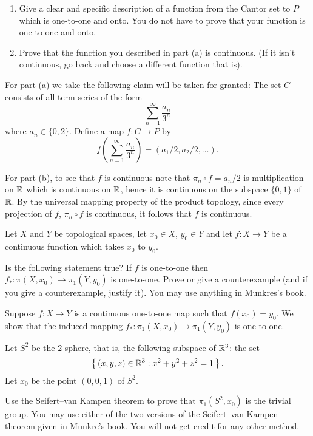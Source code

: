 \begin{problem}
  \hfill
  \begin{enumerate}[label=(\alph*),noitemsep]
  \item Give a clear and specific description of a function from the Cantor
    set to $P$ which is one-to-one and onto. You do not have to prove that
    your function is one-to-one and onto.
  \item Prove that the function you described in part (a) is
    continuous. (If it isn't continuous, go back and choose a different
    function that is).
  \end{enumerate}
\end{problem}
\begin{solution}
  For part (a) we take the following claim will be taken for granted: The
  set $C$ consists of all term series of the form
  \[
    \sum_{n=1}^\infty\frac{a_n}{3^n}
  \]
  where $a_n\in\{0,2\}$. Define a map $f\colon C\to P$ by
  \[
    f\left(\sum_{n=1}^\infty\frac{a_n}{3^n}\right)=(a_1/2,a_2/2,\ldots).
  \]

  For part (b), to see that $f$ is continuous note that
  $\pi_n\circ f=a_n/2$ is multiplication on $\mathbb{R}$ which is continuous on
  $\mathbb{R}$, hence it is continuous on the subspace $\{0,1\}$ of $\mathbb{R}$. By
  the universal mapping property of the product topology, since every
  projection of $f$, $\pi_n\circ f$ is continuous, it follows that $f$ is
  continuous.
\end{solution}

\begin{problem}
  Let $X$ and $Y$ be topological spaces, let $x_0\in X$, $y_0\in Y$ and let
  $f\colon X\to Y$ be a continuous function which takes $x_0$ to $y_0$.

  Is the following statement true? If $f$ is one-to-one then
  $f_*\colon\pi(X,x_0)\to \pi_1(Y,y_0)$ is one-to-one. Prove or give a
  counterexample (and if you give a counterexample, justify it). You may
  use anything in Munkres's book.
\end{problem}
\begin{solution}
  Suppose $f\colon X\to Y$ is a continuous one-to-one map such that
  $f(x_0)=y_0$. We show that the induced mapping $f_*\colon
  \pi_1(X,x_0)\to\pi_1(Y,y_0)$ is one-to-one.
\end{solution}

\begin{problem}
  Let $S^2$ be the $2$-sphere, that is, the following subspace of $\mathbb{R}^3$:
  the set
  \[
    \left\{\,(x,y,z)\in\mathbb{R}^3:x^2+y^2+z^2=1\,\right\}.
  \]
  Let $x_0$ be the point $(0,0,1)$ of $S^2$.


  Use the Seifert--van Kampen theorem to prove that $\pi_1(S^2,x_0)$ is the
  trivial group. You may use either of the two versions of the Seifert--van
  Kampen theorem given in Munkre's book. You will not get credit for any
  other method.
\end{problem}

\begin{solution}
\end{solution}

